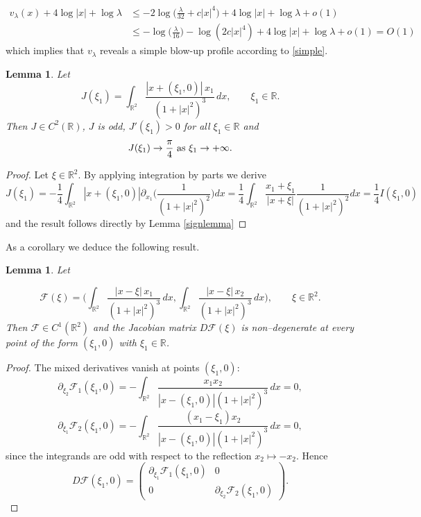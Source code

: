 \documentclass[reqno,11pt]{amsart}
\newtheorem{lemma}[thm]{Lemma}
\theoremstyle{definition}
\numberwithin{equation}{section}
\newcommand{\intr}{\int_{\R^2}}
\newcommand{\R}{\mathbb{R}}
\newcommand{\la}{\lambda}
\renewcommand{\(}{\left(}
\renewcommand{\)}{\right)}
\renewcommand{\[}{\left[}
\renewcommand{\]}{\right]}
\begin{document}
{$$ \begin{aligned}v_\la(x) +4\log|x|+\log\la&\leq -2\log\Big(\frac{\la}{32}+c|x|^4\Big)+4\log|x|+\log\la+o(1)\\ &\leq -\log\Big(\frac{\la}{16}\Big)-\log (2c|x|^{4}) +4\log|x|+\log\la+o(1)=O(1)\end{aligned}$$which implies that $v_\la$ reveals a simple blow-up profile according to \eqref{simple}. 


\begin{lemma}\label{menoo}
Let
$$
 J(\xi_1)=\int_{\mathbb{R}^2}
\frac{|x+(\xi_1,0)|\,x_1}{(1+|x|^2)^3}\,dx,
\qquad \xi_1\in\mathbb{R}.
$$
Then $J\in C^2(\mathbb{R})$, $J$ is odd, $J'(\xi_1)>0$ for all $\xi_1\in\R$ and 
$$
J(\xi_1)\to \frac\pi4\hbox{ as }\xi_1\to +\infty.
$$

\end{lemma}

\begin{proof} 

Let $\xi\in\mathbb{R}^2$. By applying integration by parts we derive
$$J(\xi_1)=-\frac14\intr |x+(\xi_1,0)|\partial_{x_1}\bigg(\frac{1}{ (1+|x|^2)^2}\bigg)dx= \frac14 \intr\frac{x_1+\xi_1}{|x+\xi|}\frac{1}{(1+|x|^2)^{2}}dx=\frac14 I(\xi_1,0)$$
and the result follows directly by Lemma \ref{signlemma}


\end{proof}


As a corollary we deduce the following result.

\begin{lemma}\label{finalcor}
Let

$$
\mathcal F(\xi)
=\bigg(
\int_{\mathbb{R}^2}\frac{|x-\xi|\,x_1}{(1+|x|^2)^3}\,dx,
\int_{\mathbb{R}^2}\frac{|x-\xi|\,x_2}{(1+|x|^2)^3}\,dx
\bigg),
\qquad \xi\in\mathbb{R}^2.
$$
Then $\mathcal F\in C^1(\mathbb{R}^2)$ and the Jacobian matrix $D\mathcal F(\xi)$ is non–degenerate at every point of the form
$(\xi_1,0)$ with $\xi_1\in\R$.
\end{lemma}

\begin{proof}
The mixed derivatives vanish at points $(\xi_1,0)$:
$$\partial_{\xi_2}\mathcal F_1(\xi_1,0)=-\int_{\mathbb R^2}
\frac{x_1x_2}{|x-(\xi_1,0)|(1+|x|^2)^3}\,dx =0,$$ $$\partial_{\xi_1}\mathcal F_2(\xi_1,0)=-\int_{\mathbb R^2}
\frac{(x_1-\xi_1)x_2}{|x-(\xi_1,0)|(1+|x|^2)^3}\,dx =0,
$$ since the integrands are odd with respect to the reflection $x_2\mapsto -x_2$.
 Hence
$$
D\mathcal F(\xi_1,0)
=
\begin{pmatrix}
\partial_{\xi_1}\mathcal F_1(\xi_1,0) & 0\\
0 & \partial_{\xi_2}\mathcal F_2(\xi_1,0)
\end{pmatrix}.
$$


\end{proof}}
\end{document}
